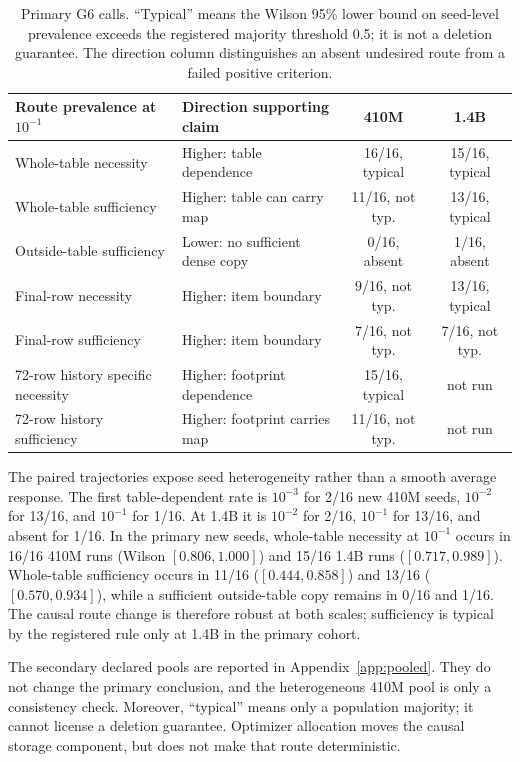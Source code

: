 \documentclass{article}
\begin{document}
\begin{table}[t]
\centering\small
\setlength{\tabcolsep}{3.5pt}
\begin{tabularx}{\linewidth}{lXcc}
\toprule
Route prevalence at $10^{-1}$ & Direction supporting claim & 410M & 1.4B \\
\midrule
Whole-table necessity & Higher: table dependence & 16/16, typical & 15/16, typical \\
Whole-table sufficiency & Higher: table can carry map & 11/16, not typ. & 13/16, typical \\
Outside-table sufficiency & Lower: no sufficient dense copy & 0/16, absent & 1/16, absent \\
Final-row necessity & Higher: item boundary & 9/16, not typ. & 13/16, typical \\
Final-row sufficiency & Higher: item boundary & 7/16, not typ. & 7/16, not typ. \\
72-row history specific necessity & Higher: footprint dependence & 15/16, typical & not run \\
72-row history sufficiency & Higher: footprint carries map & 11/16, not typ. & not run \\
\bottomrule
\end{tabularx}
\caption{Primary G6 calls. ``Typical'' means the Wilson 95\% lower bound on
seed-level prevalence exceeds the registered majority threshold 0.5; it is not
a deletion guarantee. The direction column distinguishes an absent undesired
route from a failed positive criterion.}
\label{tab:g6summary}
\end{table}

The paired trajectories expose seed heterogeneity rather than a smooth average
response. The first table-dependent rate is $10^{-3}$ for 2/16 new 410M seeds,
$10^{-2}$ for 13/16, and $10^{-1}$ for 1/16. At 1.4B it is $10^{-2}$ for 2/16,
$10^{-1}$ for 13/16, and absent for 1/16. In the primary new seeds, whole-table
necessity at $10^{-1}$ occurs in 16/16 410M runs (Wilson
$[0.806,1.000]$) and 15/16 1.4B runs ($[0.717,0.989]$). Whole-table sufficiency
occurs in 11/16 ($[0.444,0.858]$) and 13/16 ($[0.570,0.934]$), while a
sufficient outside-table copy remains in 0/16 and 1/16. The causal route change
is therefore robust at both scales; sufficiency is typical by the registered
rule only at 1.4B in the primary cohort.

The secondary declared pools are reported in Appendix~\ref{app:pooled}. They
do not change the primary conclusion, and the heterogeneous 410M pool is only a
consistency check. Moreover, ``typical'' means only a population majority; it
cannot license a deletion guarantee. Optimizer allocation moves the causal
storage component, but does not make that route deterministic.
\end{document}
